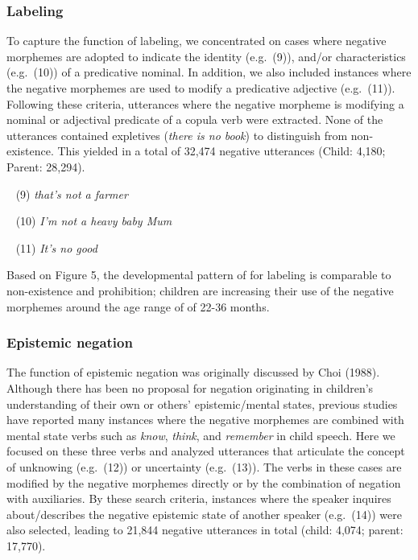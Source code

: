 \documentclass[10pt, letterpaper]{article}
\begin{document}
\hypertarget{labeling}{%
\subsubsection{Labeling}\label{labeling}}

To capture the function of labeling, we concentrated on cases where
negative morphemes are adopted to indicate the identity (e.g.~(9)),
and/or characteristics (e.g.~(10)) of a predicative nominal. In
addition, we also included instances where the negative morphemes are
used to modify a predicative adjective (e.g.~(11)). Following these
criteria, utterances where the negative morpheme is modifying a nominal
or adjectival predicate of a copula verb were extracted. None of the
utterances contained expletives (\emph{there is no book}) to distinguish
from non-existence. This yielded in a total of 32,474 negative
utterances (Child: 4,180; Parent: 28,294).

~ (9) \emph{that's not a farmer}

~ (10) \emph{I'm not a heavy baby Mum}

~ (11) \emph{It's no good}

Based on Figure 5, the developmental pattern of for labeling is
comparable to non-existence and prohibition; children are increasing
their use of the negative morphemes around the age range of of 22-36
months.

\hypertarget{epistemic-negation}{%
\subsubsection{Epistemic negation}\label{epistemic-negation}}

The function of epistemic negation was originally discussed by Choi
(1988). Although there has been no proposal for negation originating in
children's understanding of their own or others' epistemic/mental
states, previous studies have reported many instances where the negative
morphemes are combined with mental state verbs such as \emph{know},
\emph{think}, and \emph{remember} in child speech. Here we focused on
these three verbs and analyzed utterances that articulate the concept of
unknowing (e.g.~(12)) or uncertainty (e.g.~(13)). The verbs in these
cases are modified by the negative morphemes directly or by the
combination of negation with auxiliaries. By these search criteria,
instances where the speaker inquires about/describes the negative
epistemic state of another speaker (e.g.~(14)) were also selected,
leading to 21,844 negative utterances in total (child: 4,074; parent:
17,770).
\end{document}
